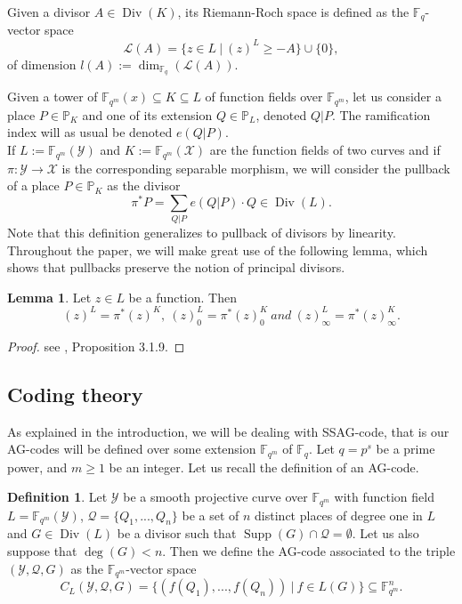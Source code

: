 \documentclass[10pt]{article}
\theoremstyle{definition}
\newtheorem{def1}[thm]{Definition}
\newtheorem{lem1}[thm]{Lemma}
\theoremstyle{definition}
\theoremstyle{definition}
\newcommand{\s}{\vspace{0.3cm}}
\newcommand{\cd}{\cdot}
\newcommand{\PP}{\mathbb{P}}
\newcommand{\fqm}{\mathbb{F}_{q^m}}
\newcommand{\fq}{\mathbb{F}_q}
\newcommand{\su}{\subseteq}
\newcommand{\X}{\mathcal{X}}
\newcommand{\Y}{\mathcal{Y}}
\newcommand{\QR}{\mathcal{Q}}
\newcommand{\Div}{\operatorname{Div}}
\newcommand{\Supp}{\operatorname{Supp}}
\begin{document}
Given a divisor $A \in \Div(K)$, its Riemann-Roch space is defined as the $\fq$-vector space
\[\mathcal{L}(A) = \{z \in L \ | \ (z)^L \geq -A\} \cup \{0\},\]
of dimension $l(A):= \dim_{\fq}(\mathcal{L}(A))$.

\s

Given a tower of $\fqm(x) \su K \su L$ of function fields over $\fqm$, let us consider a place  $P \in \PP_K$ and one of its extension $Q \in \PP_L$, denoted $Q|P$. The ramification index will as usual be denoted $e(Q|P)$. \\
If $L := \fqm(\Y)$ and $K:=\fqm(\X)$ are the function fields of two curves and if $\pi : \Y \rightarrow \X$ is the corresponding separable morphism, we will consider the pullback of a place $P \in \PP_K$ as the divisor
\[\pi^{*}P = \sum\limits_{Q|P} e(Q|P) \cd Q \in \Div(L).\]
Note that this definition generalizes to pullback of divisors by linearity. \\
Throughout the paper, we will make great use of the following lemma, which shows that pullbacks preserve the notion of principal divisors.

\s

\begin{lem1} \label{tirarr}
Let $z \in L$ be a function. Then 
\[(z)^L = \pi^*(z)^K, \ (z)^L_0 = \pi^*(z)_0^K \ and \ (z)^L_{\infty} = \pi^*(z)^K_{\infty}.\]
\end{lem1} 

\s

\begin{proof}
see \cite{Sti}, Proposition 3.1.9.
\end{proof}

\s

\subsection{Coding theory}

\s

As explained in the introduction, we will be dealing with SSAG-code, that is our AG-codes will be defined over some extension $\fqm$ of $\fq$. Let $q=p^s$ be a prime power, and $m \geq 1$ be an integer. Let us recall the definition of an AG-code.

\s

\begin{def1} \label{defagcode}
Let $\Y$ be a smooth projective curve over $\fqm$ with function field $L = \fqm(\Y)$, $\QR = \{Q_1,...,Q_n\}$ be a set of $n$ distinct places of degree one in $L$  and $G \in \Div(L)$ be a divisor such that $\Supp(G) \cap \QR = \emptyset$. Let us also suppose that $\deg(G)<n$. Then we define the AG-code associated to the triple $(\Y,\QR,G)$ as the $\fqm$-vector space
\[C_L(\Y,\QR,G) = \{ (f(Q_1),...,f(Q_n)) \ | \ f \in L(G)\} \su \fqm^n.\]
\end{def1}
\end{document}
